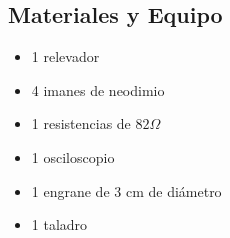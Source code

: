 \subsection{Materiales y Equipo}
\begin{multicols}{2}
\begin{itemize}
 \item 1 relevador
 \item 4 imanes de neodimio
 \item 1 resistencias de $82 \Omega$
 \item 1 osciloscopio
 \item 1 engrane de 3 cm de di\'ametro
 \item 1 taladro
\end{itemize}
\end{multicols}
